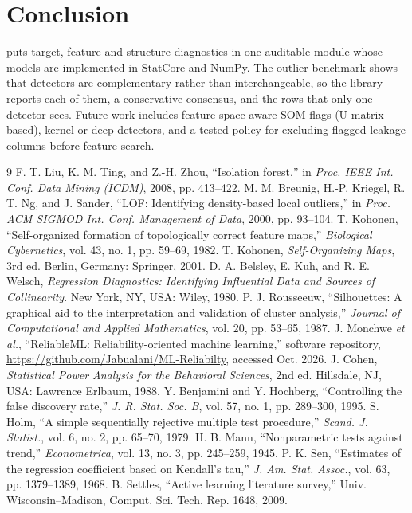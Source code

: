 \documentclass[conference]{IEEEtran}
\begin{document}
\section{Conclusion}
 puts target, feature and structure diagnostics in one auditable module whose models are implemented in StatCore and NumPy. The outlier benchmark shows that detectors are complementary rather than interchangeable, so the library reports each of them, a conservative consensus, and the rows that only one detector sees. Future work includes feature-space-aware SOM flags (U-matrix based), kernel or deep detectors, and a tested policy for excluding flagged leakage columns before feature search.

\begin{thebibliography}{9}
 F. T. Liu, K. M. Ting, and Z.-H. Zhou, ``Isolation forest,'' in \emph{Proc. IEEE Int. Conf. Data Mining (ICDM)}, 2008, pp. 413--422.
 M. M. Breunig, H.-P. Kriegel, R. T. Ng, and J. Sander, ``LOF: Identifying density-based local outliers,'' in \emph{Proc. ACM SIGMOD Int. Conf. Management of Data}, 2000, pp. 93--104.
 T. Kohonen, ``Self-organized formation of topologically correct feature maps,'' \emph{Biological Cybernetics}, vol. 43, no. 1, pp. 59--69, 1982.
 T. Kohonen, \emph{Self-Organizing Maps}, 3rd ed. Berlin, Germany: Springer, 2001.
 D. A. Belsley, E. Kuh, and R. E. Welsch, \emph{Regression Diagnostics: Identifying Influential Data and Sources of Collinearity}. New York, NY, USA: Wiley, 1980.
 P. J. Rousseeuw, ``Silhouettes: A graphical aid to the interpretation and validation of cluster analysis,'' \emph{Journal of Computational and Applied Mathematics}, vol. 20, pp. 53--65, 1987.
 J. Monchwe \emph{et al.}, ``ReliableML: Reliability-oriented machine learning,'' software repository, \url{https://github.com/Jabualani/ML-Reliabilty}, accessed Oct. 2026.
 J. Cohen, \emph{Statistical Power Analysis for the Behavioral Sciences}, 2nd ed. Hillsdale, NJ, USA: Lawrence Erlbaum, 1988.
 Y. Benjamini and Y. Hochberg, ``Controlling the false discovery rate,'' \emph{J. R. Stat. Soc. B}, vol. 57, no. 1, pp. 289--300, 1995.
 S. Holm, ``A simple sequentially rejective multiple test procedure,'' \emph{Scand. J. Statist.}, vol. 6, no. 2, pp. 65--70, 1979.
 H. B. Mann, ``Nonparametric tests against trend,'' \emph{Econometrica}, vol. 13, no. 3, pp. 245--259, 1945.
 P. K. Sen, ``Estimates of the regression coefficient based on Kendall's tau,'' \emph{J. Am. Stat. Assoc.}, vol. 63, pp. 1379--1389, 1968.
 B. Settles, ``Active learning literature survey,'' Univ. Wisconsin--Madison, Comput. Sci. Tech. Rep. 1648, 2009.
\end{thebibliography}
\end{document}
